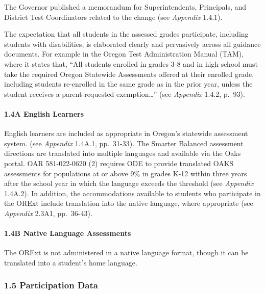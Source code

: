 \documentclass[]{article}
\let\oldparagraph\paragraph
\renewcommand{\paragraph}[1]{\oldparagraph{#1}\mbox{}}
\begin{document}
The Governor published a memorandum for Superintendents, Principals, and
District Test Coordinators related to the change (see \emph{Appendix}
1.4.1).

The expectation that all students in the assessed grades participate,
including students with disabilities, is elaborated clearly and
pervasively across all guidance documents. For example in the Oregon
Test Administration Manual (TAM), where it states that, ``All students
enrolled in grades 3-8 and in high school must take the required Oregon
Statewide Assessments offered at their enrolled grade, including
students re-enrolled in the same grade as in the prior year, unless the
student receives a parent-requested exemption\ldots{}'' (see
\emph{Appendix} 1.4.2, p.~93).

\paragraph{1.4A English Learners}\label{a-english-learners}

English learners are included as appropriate in Oregon's statewide
assessment system. (see \emph{Appendix} 1.4A.1, pp.~31-33). The Smarter
Balanced assessment directions are translated into multiple languages
and available via the Oaks portal. OAR 581-022-0620 (2) requires ODE to
provide translated OAKS assessments for populations at or above 9\% in
grades K-12 within three years after the school year in which the
language exceeds the threshold (see \emph{Appendix} 1.4A.2). In
addition, the accommodations available to students who participate in
the ORExt include translation into the native language, where
appropriate (see \emph{Appendix} 2.3A1, pp.~36-43).

\paragraph{1.4B Native Language
Assessments}\label{b-native-language-assessments}

The ORExt is not administered in a native language format, though it can
be translated into a student's home language.

\subsubsection{1.5 Participation Data}\label{participation-data}
\end{document}
